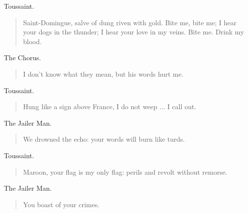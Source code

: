 \documentclass[letterpaper,article,12pt,oneside,notitlepage]{memoir}
\begin{document}
\begin{center}Toussaint.\end{center}

\begin{verse}
\indent Saint-Domingue, salve of dung riven with gold. Bite me, bite me; I hear your dogs in the thunder; I hear your love in my veins. Bite me. Drink my blood. \\
\end{verse}

\begin{center}The Chorus.\end{center}

\begin{verse}
\hspace{1cm} I don't know what they mean, but his words hurt me. \\
\end{verse}

\begin{center}Toussaint.\end{center}

\begin{verse}
\indent Hung like a sign above France, I do not weep ... I call out. \\
\end{verse}

\begin{center}The Jailer Man.\end{center}

\begin{verse}
We drowned the echo: your words will burn like turds. \\
\end{verse}

\clearpage

\begin{center}Toussaint.\end{center}

\begin{verse}
Maroon, your flag is my only flag: perils and revolt without remorse. \\
\end{verse}

\begin{center}The Jailer Man.\end{center}

\begin{verse}
You boast of your crimes. \\
\end{verse}
\end{document}
